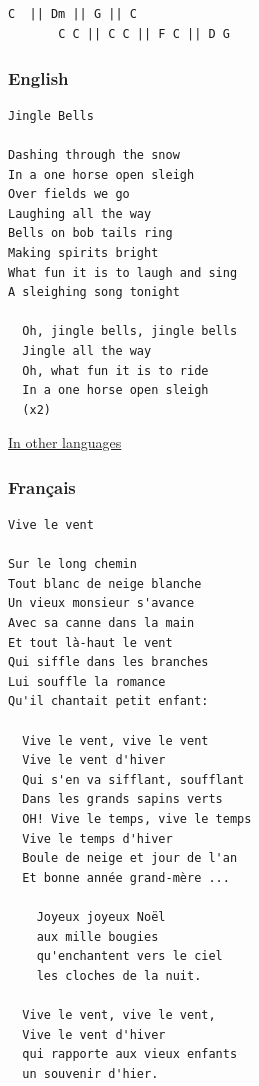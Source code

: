 \documentclass[
]{article}
\begin{document}
\hypertarget{section-3}{%
\subsection*{}\label{section-3}}

\begin{verbatim}
C  || Dm || G || C
       C C || C C || F C || D G
\end{verbatim}

\hypertarget{english-1}{%
\subsubsection*{English}\label{english-1}}

\begin{verbatim}
Jingle Bells

Dashing through the snow
In a one horse open sleigh
Over fields we go
Laughing all the way
Bells on bob tails ring
Making spirits bright
What fun it is to laugh and sing
A sleighing song tonight

  Oh, jingle bells, jingle bells
  Jingle all the way
  Oh, what fun it is to ride
  In a one horse open sleigh 
  (x2)
\end{verbatim}

\href{https://omniglot.com/songs/multilingual/jinglebells/german.php}{In
other languages}

\hypertarget{franuxe7ais-1}{%
\subsubsection*{Français}\label{franuxe7ais-1}}

\begin{verbatim}
Vive le vent

Sur le long chemin 
Tout blanc de neige blanche 
Un vieux monsieur s'avance 
Avec sa canne dans la main 
Et tout là-haut le vent 
Qui siffle dans les branches 
Lui souffle la romance 
Qu'il chantait petit enfant:

  Vive le vent, vive le vent 
  Vive le vent d'hiver 
  Qui s'en va sifflant, soufflant 
  Dans les grands sapins verts 
  OH! Vive le temps, vive le temps 
  Vive le temps d'hiver 
  Boule de neige et jour de l'an 
  Et bonne année grand-mère ... 

    Joyeux joyeux Noël 
    aux mille bougies 
    qu'enchantent vers le ciel   
    les cloches de la nuit.
    
  Vive le vent, vive le vent,
  Vive le vent d'hiver 
  qui rapporte aux vieux enfants
  un souvenir d'hier.
\end{verbatim}
\end{document}
